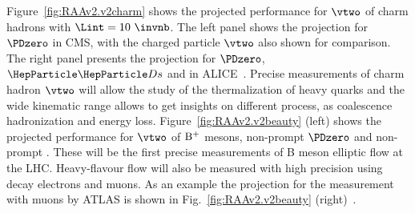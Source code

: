 Figure~\ref{fig:RAAv2.v2charm} shows the projected performance for $\vtwo$ of charm hadrons with $\Lint=10~\invnb$. The left panel shows the projection for $\PDzero$ in CMS, with the charged particle $\vtwo$ also shown for comparison. The right panel presents the projection for $\PDzero$, $\PDs$ and \PGLc in ALICE~\cite{Abelev:1625842}. Precise measurements of charm hadron $\vtwo$ will allow the study of the thermalization of heavy quarks and the wide kinematic range allows to get insights on different process, as coalescence hadronization and energy loss. Figure~\ref{fig:RAAv2.v2beauty} (left) shows the projected performance for $\vtwo$ of $\rm B^+$ mesons, non-prompt $\PDzero$ and non-prompt \PJGy. These will be the first precise measurements of B meson elliptic flow at the LHC.
Heavy-flavour flow will also be measured with high precision using decay electrons and muons. As an example the projection for the measurement with muons by ATLAS is shown in Fig.~\ref{fig:RAAv2.v2beauty} (right)~\cite{ATL-PHYS-PUB-2018-020}.

